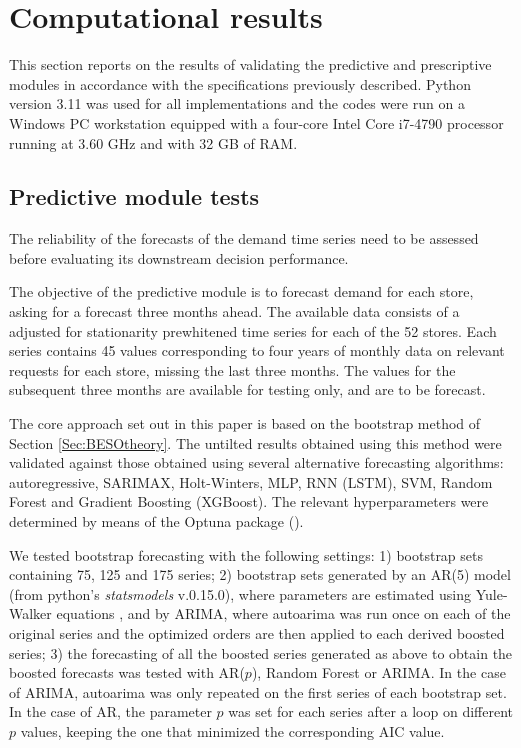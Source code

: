 \documentclass[mnsc,sglanonrev]{informs4}  %
\theoremstyle{remark}\newtheorem{remark}{Remark}
\begin{document}
\section{Computational results} \label{Sec:results}

This section reports on the results of validating the predictive and prescriptive modules in accordance with the specifications previously described. Python version 3.11 was used for all implementations and the codes were run on a Windows PC workstation equipped with a four-core Intel Core i7-4790 processor running at 3.60 GHz and with 32 GB of RAM.

\subsection{Predictive module tests}    \label{Subsec:predtest}

The reliability of the forecasts of the demand time series need to be assessed before evaluating its downstream decision performance.

The objective of the predictive module is to forecast demand for each store, asking for a forecast three months ahead.
The available data consists of a adjusted for stationarity prewhitened time series for each of the 52 stores. Each series contains 45 values corresponding to four years of monthly data on relevant requests for each store, missing the last three months. The values for the subsequent three months are available for testing only, and are to be forecast.

    The core approach set out in this paper is based on the bootstrap method of Section \ref{Sec:BESOtheory}. The untilted results obtained using this method were validated against those obtained using several alternative forecasting algorithms: autoregressive, SARIMAX, Holt-Winters, MLP, RNN (LSTM), SVM, Random Forest and Gradient Boosting (XGBoost). The relevant hyperparameters were determined by means of the Optuna package (\citep{optuna19}).

We tested bootstrap forecasting with the following settings: 
1) bootstrap sets containing 75, 125 and 175 series; 
2) bootstrap sets generated by an AR(5) model (from python's \textit{statsmodels} v.0.15.0), where parameters are estimated using Yule-Walker equations \citep{BD91}, and by ARIMA, where autoarima was run once on each of the original series and the optimized orders are then applied to each derived boosted series; 
3) the forecasting of all the boosted series generated as above to obtain the boosted forecasts was tested with AR($p$), Random Forest or ARIMA. In the case of ARIMA, autoarima was only repeated on the first series of each bootstrap set. In the case of AR, the parameter $p$ was set for each series after a loop on different $p$ values, keeping the one that minimized the corresponding AIC value.
\end{document}
